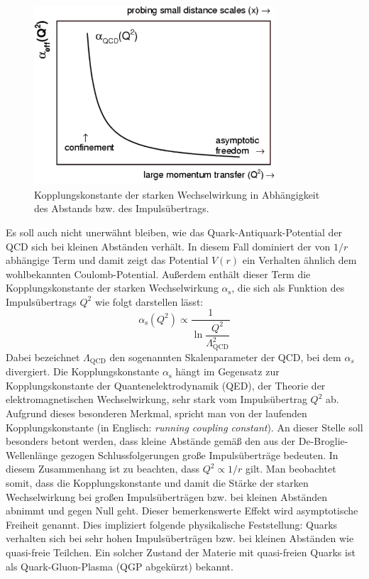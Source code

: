 \documentclass[12pt,a4paper]{report}
\begin{document}
\begin{figure}
\centering
\includegraphics[width=9cm]{KoppKonst.png} 
\caption{Kopplungskonstante der starken Wechselwirkung in Abhängigkeit des Abstands bzw. des Impulsübertrags. \cite{Group:2006bn}}
\label{KoppKonst}
\end{figure}
Es soll auch nicht unerwähnt bleiben, wie das Quark-Antiquark-Potential der QCD sich bei kleinen Abständen verhält. In diesem Fall dominiert der von $1/r$ abhängige Term und damit zeigt das Potential $V(r)$ ein Verhalten ähnlich dem wohlbekannten Coulomb-Potential. Außerdem enthält dieser Term die Kopplungskonstante der starken Wechselwirkung $\alpha_{\mathrm{s}}$, die sich als Funktion des Impulsübertrags $Q^{2}$ wie folgt darstellen lässt:
\begin{equation} \label{eq:KoppKonstante}
  \alpha_{\mathrm{s}}(Q^{2})\propto\dfrac{1}{\ln{\dfrac{Q^{2}}{\Lambda_{\mathrm{QCD}}^{2}}}}
\end{equation}
Dabei bezeichnet $\Lambda_{\mathrm{QCD}}$ den sogenannten Skalenparameter der QCD, bei dem $\alpha_{s}$ divergiert. Die Kopplungskonstante $\alpha_{\mathrm{s}}$ hängt im Gegensatz zur Kopplungskonstante der Quantenelektrodynamik (QED), der Theorie der elektromagnetischen Wechselwirkung, sehr stark vom Impulsübertrag $Q^{2}$ ab. Aufgrund dieses besonderen Merkmal, spricht man von der laufenden Kopplungskonstante (in Englisch: \textit{running coupling constant}). An dieser Stelle soll besonders betont werden, dass kleine Abstände gemäß den aus der De-Broglie-Wellenlänge gezogen Schlussfolgerungen große Impulsüberträge bedeuten. In diesem Zusammenhang ist zu beachten, dass $Q^{2}\propto 1/r$ gilt. Man beobachtet somit, dass die Kopplungskonstante und damit die Stärke der starken Wechselwirkung bei großen Impulsüberträgen bzw. bei kleinen Abständen abnimmt und gegen Null geht. Dieser bemerkenswerte Effekt wird asymptotische Freiheit genannt. Dies impliziert folgende physikalische Feststellung: Quarks verhalten sich bei sehr hohen Impulsüberträgen bzw. bei kleinen Abständen wie quasi-freie Teilchen. Ein solcher Zustand der Materie mit quasi-freien Quarks ist als Quark-Gluon-Plasma (QGP abgekürzt) bekannt.
\end{document}
